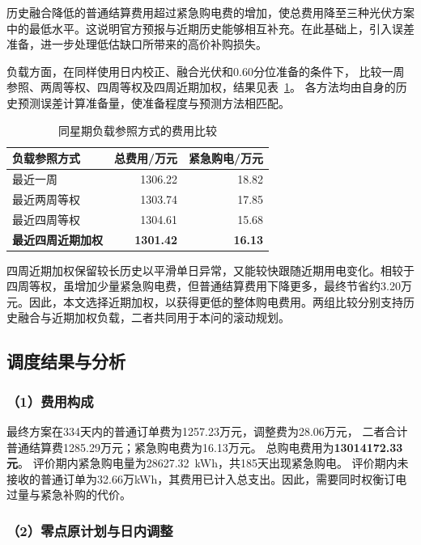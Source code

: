 历史融合降低的普通结算费用超过紧急购电费的增加，使总费用降至三种光伏方案中的最低水平。这说明官方预报与近期历史能够相互补充。在此基础上，引入误差准备，进一步处理低估缺口所带来的高价补购损失。

负载方面，在同样使用日内校正、融合光伏和0.60分位准备的条件下，
比较一周参照、两周等权、四周等权及四周近期加权，结果见表~\ref{tab:q3_load_compare}。
各方法均由自身的历史预测误差计算准备量，使准备程度与预测方法相匹配。

\begin{table}[!htbp]
\centering
\caption{同星期负载参照方式的费用比较}
\label{tab:q3_load_compare}
\begin{tabular}{lrr}
\toprule
负载参照方式 & 总费用/万元 & 紧急购电/万元\\
\midrule
最近一周 &1306.22&18.82\\
最近两周等权 &1303.74&17.85\\
最近四周等权 &1304.61&15.68\\
\textbf{最近四周近期加权} &\textbf{1301.42}&\textbf{16.13}\\
\bottomrule
\end{tabular}
\end{table}

四周近期加权保留较长历史以平滑单日异常，又能较快跟随近期用电变化。相较于四周等权，虽增加少量紧急购电费，但普通结算费用下降更多，最终节省约3.20万元。因此，本文选择近期加权，以获得更低的整体购电费用。两组比较分别支持历史融合与近期加权负载，二者共同用于本问的滚动规划。

\subsection{调度结果与分析}

\subsubsection*{（1）费用构成}

最终方案在334天内的普通订单费为1257.23万元，调整费为28.06万元，
二者合计普通结算费1285.29万元；紧急购电费为16.13万元。
总购电费用为\textbf{13014172.33元}。
评价期内紧急购电量为28627.32~kWh，共185天出现紧急购电。
评价期内未接收的普通订单为32.66万kWh，其费用已计入总支出。因此，需要同时权衡订电过量与紧急补购的代价。

\subsubsection*{（2）零点原计划与日内调整}

